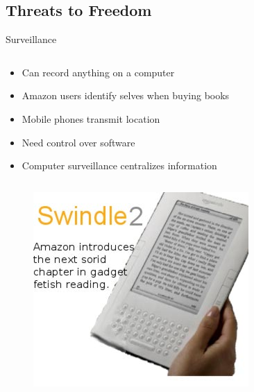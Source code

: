 \subsection{Threats to Freedom}
\begin{frame}{Surveillance}
  \begin{column}{0.45\textwidth}
    \begin{itemize}
      \item Can record anything on a computer
      \item Amazon users identify selves when buying books
      \item Mobile phones transmit location
      \item Need control over software
      \item Computer surveillance centralizes information
    \end{itemize}
  \end{column}
  \begin{column}{0.5\textwidth}\raggedleft{}
    \begin{figure}
      \includegraphics[width=\textwidth]{images/swindle.jpg}
      \caption{\Protect\cite{swindle}}
    \end{figure}
  \end{column}
\end{frame}

